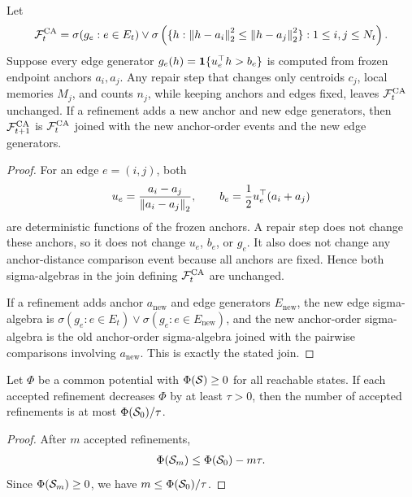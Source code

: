 \begin{theorem}
\label{thm:anchor-stable:formal}
Let
\begin{align*}
\mathcal{F}_t^{\mathrm{CA}}
=
\sigma(g_e:e\in E_t)
\vee
\sigma\left(\{h:\left\lVert h-a_i\right\rVert_2^2\le \left\lVert h-a_j\right\rVert_2^2\}:1\le i,j\le N_t\right).
\end{align*}
Suppose every edge generator $g_e(h)=\mathbf{1}\{u_e^\top h>b_e\}$ is computed from frozen endpoint anchors $a_i,a_j$. Any repair step that changes only centroids $c_j$, local memories $M_j$, and counts $n_j$, while keeping anchors and edges fixed, leaves $\mathcal{F}_t^{\mathrm{CA}}$ unchanged. If a refinement adds a new anchor and new edge generators, then $\mathcal{F}_{t+1}^{\mathrm{CA}}$ is $\mathcal{F}_t^{\mathrm{CA}}$ joined with the new anchor-order events and the new edge generators.
\end{theorem}
\begin{proof}
For an edge $e=(i,j)$, both
\begin{align*}
u_e=\frac{a_i-a_j}{\left\lVert a_i-a_j\right\rVert_2},
\qquad
b_e=\frac{1}{2}u_e^\top(a_i+a_j)
\end{align*}
are deterministic functions of the frozen anchors. A repair step does not change these anchors, so it does not change $u_e$, $b_e$, or $g_e$. It also does not change any anchor-distance comparison event because all anchors are fixed. Hence both sigma-algebras in the join defining $\mathcal{F}_t^{\mathrm{CA}}$ are unchanged.

If a refinement adds anchor $a_{\mathrm{new}}$ and edge generators $E_{\mathrm{new}}$, the new edge sigma-algebra is $\sigma(g_e:e\in E_t)\vee\sigma(g_e:e\in E_{\mathrm{new}})$, and the new anchor-order sigma-algebra is the old anchor-order sigma-algebra joined with the pairwise comparisons involving $a_{\mathrm{new}}$. This is exactly the stated join.
\end{proof}

\begin{corollary}
\label{cor:finite-refinements:formal}
Let $\Phi$ be a common potential with $\Phi(\mathcal{S})\ge0$ for all reachable states. If each accepted refinement decreases $\Phi$ by at least $\tau>0$, then the number of accepted refinements is at most $\Phi(\mathcal{S}_0)/\tau$.
\end{corollary}
\begin{proof}
After $m$ accepted refinements,
\begin{align*}
\Phi(\mathcal{S}_m)\le \Phi(\mathcal{S}_0)-m\tau.
\end{align*}
Since $\Phi(\mathcal{S}_m)\ge0$, we have $m\le \Phi(\mathcal{S}_0)/\tau$.
\end{proof}

